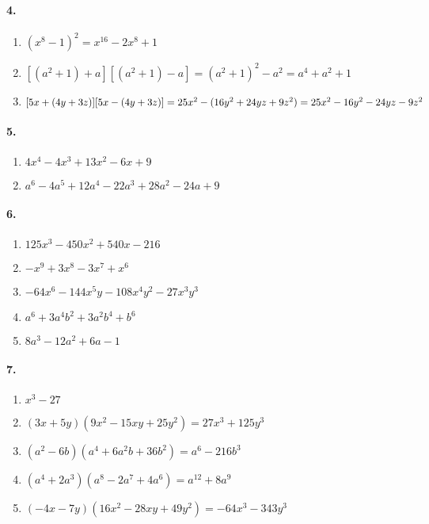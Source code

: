 \documentclass[a4paper,12pt]{article}
\begin{document}
\paragraph*{4.}
\begin{enumerate}
  \item \((x^8-1)^2=x^{16}-2x^8+1\)
  \item \([(a^2+1)+a][(a^2+1)-a]=(a^2+1)^2-a^2=a^4+a^2+1\)
  \item \([5x+(4y+3z)][5x-(4y+3z)]=25x^2-(16y^2+24yz+9z^2)\\=25x^2-16y^2-24yz-9z^2\)
\end{enumerate}

\paragraph*{5.}
\begin{enumerate}
  \item \(4x^4-4x^3+13x^2-6x+9\)
  \item \(a^6-4a^5+12a^4-22a^3+28a^2-24a+9\)
\end{enumerate}

\paragraph*{6.}
\begin{enumerate}
  \item \(125x^3-450x^2+540x-216\)
  \item \({-}x^9+3x^8-3x^7+x^6\)
  \item \({-}64x^6-144x^5y-108x^4y^2-27x^3y^3\)
  \item \(a^6+3a^4b^2+3a^2b^4+b^6\)
  \item \(8a^3-12a^2+6a-1\)
\end{enumerate}

\paragraph*{7.}
\begin{enumerate}
  \item \(x^3-27\)
  \item \((3x+5y)(9x^2-15xy+25y^2)=27x^3+125y^3\)
  \item \((a^2-6b)(a^4+6a^2b+36b^2)=a^6-216b^3\)
  \item \((a^4+2a^3)(a^8-2a^7+4a^6)=a^{12}+8a^9\)
  \item \(({-}4x-7y)(16x^2-28xy+49y^2)={-}64x^3-343y^3\)
\end{enumerate}
\end{document}
